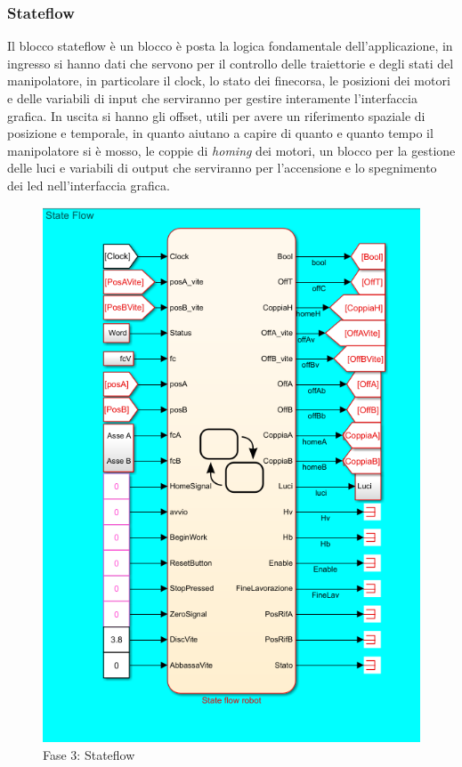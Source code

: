 \subsubsection*{Stateflow}
Il blocco stateflow è un blocco è posta la logica fondamentale dell'applicazione, in ingresso si hanno dati che servono per il controllo delle traiettorie e degli stati del manipolatore, in particolare il clock, lo stato dei finecorsa, le posizioni dei motori e delle variabili di input che serviranno per gestire interamente l'interfaccia grafica. In uscita si hanno gli offset, utili per avere un riferimento spaziale di posizione e temporale, in quanto aiutano a capire di quanto e quanto tempo il manipolatore si è mosso, le coppie di \textit{homing} dei motori, un blocco per la gestione delle luci e variabili di output che serviranno per l'accensione e lo spegnimento dei led nell'interfaccia grafica.
\begin{figure}[ht]
	\begin{center}
		\includegraphics[scale=0.84]{Immagini/Sperimentale/sf0new}
		\caption{Fase 3: Stateflow}
		\label{fig:Stateflow1}
	\end{center}
\end{figure}
